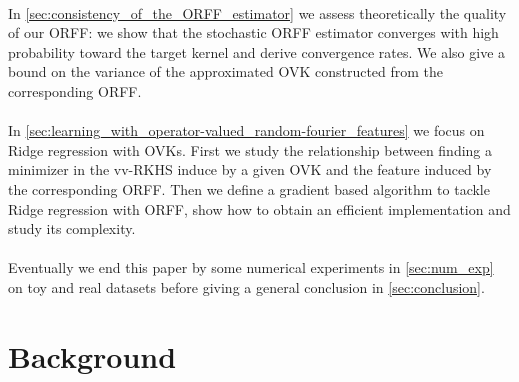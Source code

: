 \documentclass[twoside,11pt]{article}
\begin{document}
\paragraph{}
In \cref{sec:consistency_of_the_ORFF_estimator} we assess theoretically the
quality of our \acs{ORFF}: we show that the stochastic \acs{ORFF} estimator
converges with high probability toward the target kernel and derive convergence
rates. We also give a bound on the variance of the approximated \acs{OVK}
constructed from the corresponding \acs{ORFF}.
\paragraph{}
In \cref{sec:learning_with_operator-valued_random-fourier_features} we focus on
Ridge regression with \acsp{OVK}. First we study the relationship between
finding a minimizer in the \acs{vv-RKHS} induce by a given \acs{OVK} and the
feature induced by the corresponding \acs{ORFF}. Then we define a gradient
based algorithm to tackle Ridge regression with \acs{ORFF}, show how to
obtain an efficient implementation and study its complexity.
\paragraph{}
Eventually we end this paper by some numerical experiments in
\cref{sec:num_exp} on toy and real datasets before giving a general conclusion
in  \cref{sec:conclusion}.

\section{Background}
\label{sec:background}

\end{document}
